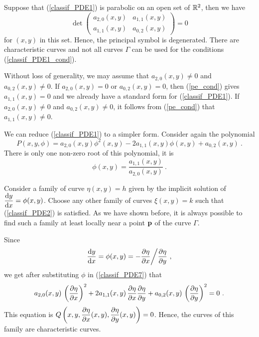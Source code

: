 Suppose that (\ref{classif_PDE1}) is parabolic on an open set of
$\mathbb{R}^2$, then we have
\begin{equation}\label{pe_cond}
\det \begin{pmatrix}
a_{2,0}(x,y) & a_{1,1}(x,y) \\
a_{1,1}(x,y) & a_{0,2}(x,y)  
\end{pmatrix}
=0
\end{equation}
for $(x,y)$ in this set.  Hence, the principal symbol is
degenerated.  There are characteristic curves and not all curves
$\Gamma$ can be used for the conditions
(\ref{classif_PDE1_cond}).

Without loss of generality, we may assume that $a_{2,0}(x,y) \neq 0$
and $a_{0,2}(x,y) \neq 0$.  If $a_{2,0}(x,y)=0$ or 
$a_{0,2}(x,y) =0$, then (\ref{pe_cond}) gives $a_{1,1}(x,y)=0$ and
we already have a standard form for (\ref{classif_PDE1}).  If
$a_{2,0}(x,y) \neq 0$ and $a_{0,2}(x,y) \neq 0$, it follows from
(\ref{pe_cond}) that $a_{1,1}(x,y) \neq 0$.

We can reduce (\ref{classif_PDE1}) to a simpler form.  Consider again
the polynomial
\begin{equation} \label{classif_PDE7}
P(x,y,\phi) = a_{2,0}(x,y) \phi^2(x,y) - 2a_{1,1}(x,y) \phi(x,y)
+ a_{0,2}(x,y) \ .
\end{equation}
There is only one non-zero root of this polynomial, it is
\[
\phi(x,y) = \frac{a_{1,1}(x,y)}{a_{2,0}(x,y)} \ .
\]

Consider a family of curve $\eta(x,y)=h$ given by the
implicit solution of $\displaystyle \frac{\mathrm{d}y}{\mathrm{d}{x}} = \phi(x,y)$.
Choose any other family of curves $\xi(x,y)=k$ such that
(\ref{classif_PDE2}) is satisfied.  As we have shown before, it is
always possible to find such a family at least locally near a point
$\mathbf{p}$ of the curve $\Gamma$.

Since
\[
\frac{\mathrm{d}y}{\mathrm{d}{x}} = \phi(x,y) = -\frac{\partial{\eta}}{\partial x}\bigg/ \frac{\partial{\eta}}{\partial y} \ ,
\]
we get after substituting $\phi$ in
(\ref{classif_PDE7}) that
\begin{equation} \label{classif_ParEq1}
a_{2,0}(x,y) \,\left(\frac{\partial{\eta}}{\partial x}\right)^2 + 2a_{1,1}(x,y)\,
\frac{\partial{\eta}}{\partial x} \frac{\partial{\eta}}{\partial y}  +
a_{0,2}(x,y)\,\left(\frac{\partial{\eta}}{\partial y}\right)^2 = 0 \ .
\end{equation}
This equation is
$\displaystyle Q\left(x,y,\frac{\partial{\eta}}{\partial x}(x,y),\frac{\partial{\eta}}{\partial y}(x,y)\right) = 0$.
Hence, the curves of this family are characteristic curves.

